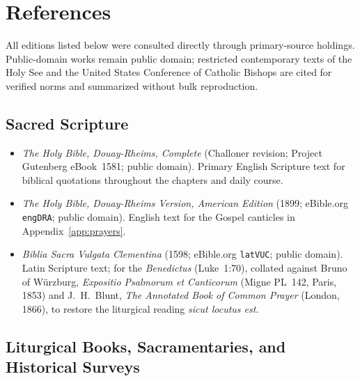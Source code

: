 \section{References}\label{app:references}

All editions listed below were consulted directly through primary-source
holdings. Public-domain works remain public domain; restricted contemporary
texts of the Holy See and the United States Conference of Catholic Bishops are
cited for verified norms and summarized without bulk reproduction.

\subsection{Sacred Scripture}

\begin{itemize}
\item \textit{The Holy Bible, Douay-Rheims, Complete} (Challoner revision;
Project Gutenberg eBook~1581; public domain). Primary English Scripture text for
biblical quotations throughout the chapters and daily course.
\item \textit{The Holy Bible, Douay-Rheims Version, American Edition} (1899;
eBible.org \texttt{engDRA}; public domain). English text for the Gospel
canticles in Appendix~\ref{app:prayers}.
\item \textit{Biblia Sacra Vulgata Clementina} (1598; eBible.org
\texttt{latVUC}; public domain). Latin Scripture text; for the
\textit{Benedictus} (Luke~1:70), collated against Bruno of W\"urzburg,
\textit{Expositio Psalmorum et Canticorum} (Migne PL~142, Paris, 1853) and
J.~H.~Blunt, \textit{The Annotated Book of Common Prayer} (London, 1866), to
restore the liturgical reading \textit{sicut locutus est}.
\end{itemize}

\subsection{Liturgical Books, Sacramentaries, and Historical Surveys}

